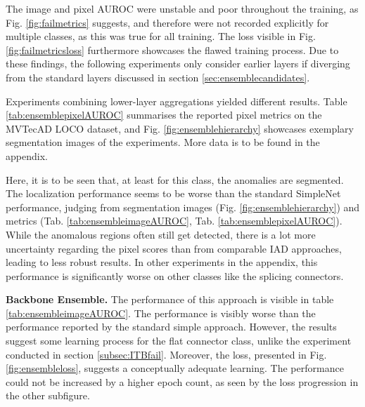 

The image and pixel AUROC were unstable and poor throughout the training, 
as Fig. \ref{fig:failmetrics} suggests, and therefore were not recorded explicitly for multiple classes, as this was true for all training. The loss visible in Fig. \ref{fig:failmetricsloss} furthermore 
showcases the flawed training process. Due to these findings, the following experiments only consider earlier layers if diverging from the standard layers 
discussed in section \ref{sec:ensemblecandidates}.




Experiments combining lower-layer aggregations yielded different results. Table \ref{tab:ensemblepixelAUROC} summarises the reported pixel metrics on the MVTecAD LOCO \cite{LOCODentsAndScratchesBergmann2022} 
dataset, and Fig. \ref{fig:ensemblehierarchy} showcases exemplary 
segmentation images of the experiments. More data is to be found in the appendix.



Here, it is to be seen that, at least for this class, the anomalies are segmented. The localization performance seems to be worse than the standard SimpleNet \cite{liu2023simplenet} 
performance, judging from segmentation images (Fig. \ref{fig:ensemblehierarchy}) and metrics (Tab. \ref{tab:ensembleimageAUROC}, Tab. \ref{tab:ensemblepixelAUROC}). While the anomalous regions often still get detected, there is a lot more uncertainty regarding 
the pixel scores than from comparable IAD approaches, leading to less robust results. In other experiments in the appendix, this performance is significantly worse on 
other classes like the splicing connectors.



\textbf{Backbone Ensemble.} The performance of this approach is visible in table \ref{tab:ensembleimageAUROC}. The performance is visibly worse than the performance 
reported by the standard simple approach. However, the results suggest some learning process for the flat connector class, unlike the experiment conducted in section \ref{subsec:ITBfail}. 
Moreover, the loss, presented in Fig. \ref{fig:ensembleloss}, suggests a conceptually adequate learning. The performance could not be increased by a higher 
epoch count, as seen by the loss progression in the other subfigure.



